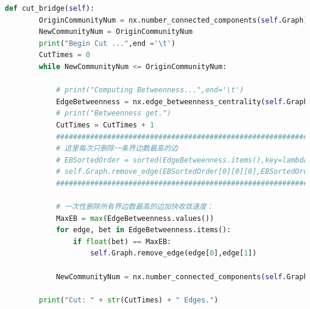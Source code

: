 \documentclass{ctexart}
\begin{document}
    \begin{lstlisting}[language=python, basicstyle=\footnotesize,keywordstyle=\color{blue!100},commentstyle=\color{red!100!},frame=shadowbox, rulesepcolor=\color{red!20!green!20!blue!20}]
        def cut_bridge(self):
        OriginCommunityNum = nx.number_connected_components(self.Graph)
        NewCommunityNum = OriginCommunityNum
        print("Begin Cut ...",end ='\t')
        CutTimes = 0
        while NewCommunityNum <= OriginCommunityNum:

            # print("Computing Betweenness...",end='\t')
            EdgeBetweenness = nx.edge_betweenness_centrality(self.Graph)
            # print("Betweenness get.")
            CutTimes = CutTimes + 1
            ################################################################################
            # 这里每次只删除一条界边数最高的边
            # EBSortedOrder = sorted(EdgeBetweenness.items(),key=lambda x:x[1],reverse=True)
            # self.Graph.remove_edge(EBSortedOrder[0][0][0],EBSortedOrder[0][0][1])
            #################################################################################

            # 一次性删除所有界边数最高的边加快收敛速度：
            MaxEB = max(EdgeBetweenness.values())
            for edge, bet in EdgeBetweenness.items():
                if float(bet) == MaxEB:
                    self.Graph.remove_edge(edge[0],edge[1])

            NewCommunityNum = nx.number_connected_components(self.Graph)

        print("Cut: " + str(CutTimes) + " Edges.")
    \end{lstlisting}
\end{document}
